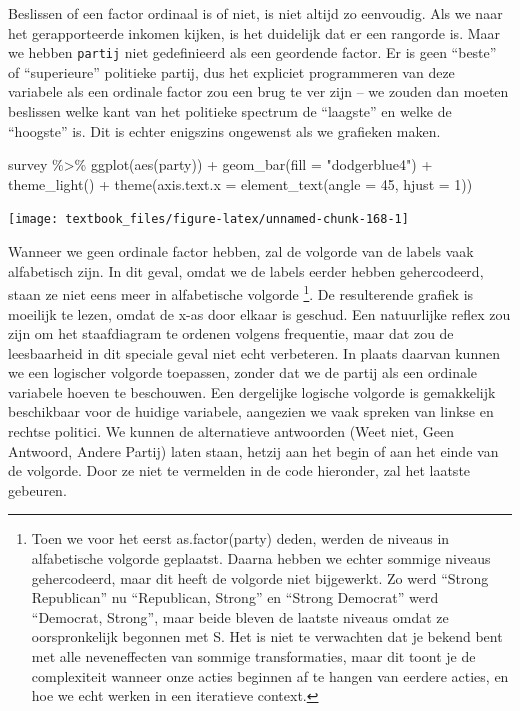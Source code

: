 \documentclass[]{tufte-book}
\newenvironment{Shaded}{}{}
\newcommand{\AttributeTok}[1]{\textcolor[rgb]{0.49,0.56,0.16}{#1}}
\newcommand{\DecValTok}[1]{\textcolor[rgb]{0.25,0.63,0.44}{#1}}
\newcommand{\FunctionTok}[1]{\textcolor[rgb]{0.02,0.16,0.49}{#1}}
\newcommand{\NormalTok}[1]{#1}
\newcommand{\SpecialCharTok}[1]{\textcolor[rgb]{0.25,0.44,0.63}{#1}}
\newcommand{\StringTok}[1]{\textcolor[rgb]{0.25,0.44,0.63}{#1}}
\begin{document}
Beslissen of een factor ordinaal is of niet, is niet altijd zo eenvoudig. Als we naar het gerapporteerde inkomen kijken, is het duidelijk dat er een rangorde is. Maar we hebben \texttt{partij} niet gedefinieerd als een geordende factor. Er is geen ``beste'' of ``superieure'' politieke partij, dus het expliciet programmeren van deze variabele als een ordinale factor zou een brug te ver zijn -- we zouden dan moeten beslissen welke kant van het politieke spectrum de ``laagste'' en welke de ``hoogste'' is. Dit is echter enigszins ongewenst als we grafieken maken.

\begin{Shaded}
\begin{Highlighting}[]
\NormalTok{survey }\SpecialCharTok{\%\textgreater{}\%}
  \FunctionTok{ggplot}\NormalTok{(}\FunctionTok{aes}\NormalTok{(party)) }\SpecialCharTok{+}
  \FunctionTok{geom\_bar}\NormalTok{(}\AttributeTok{fill =} \StringTok{"dodgerblue4"}\NormalTok{) }\SpecialCharTok{+}
  \FunctionTok{theme\_light}\NormalTok{() }\SpecialCharTok{+}
  \FunctionTok{theme}\NormalTok{(}\AttributeTok{axis.text.x =} \FunctionTok{element\_text}\NormalTok{(}\AttributeTok{angle =} \DecValTok{45}\NormalTok{, }\AttributeTok{hjust =} \DecValTok{1}\NormalTok{))}
\end{Highlighting}
\end{Shaded}

\texttt{[image: textbook\_files/figure-latex/unnamed-chunk-168-1]}

Wanneer we geen ordinale factor hebben, zal de volgorde van de labels vaak alfabetisch zijn. In dit geval, omdat we de labels eerder hebben gehercodeerd, staan ze niet eens meer in alfabetische volgorde \footnote{Toen we voor het eerst as.factor(party) deden, werden de niveaus in alfabetische volgorde geplaatst. Daarna hebben we echter sommige niveaus gehercodeerd, maar dit heeft de volgorde niet bijgewerkt. Zo werd ``Strong Republican'' nu ``Republican, Strong'' en ``Strong Democrat'' werd ``Democrat, Strong'', maar beide bleven de laatste niveaus omdat ze oorspronkelijk begonnen met S. Het is niet te verwachten dat je bekend bent met alle neveneffecten van sommige transformaties, maar dit toont je de complexiteit wanneer onze acties beginnen af te hangen van eerdere acties, en hoe we echt werken in een iteratieve context.}. De resulterende grafiek is moeilijk te lezen, omdat de x-as door elkaar is geschud. Een natuurlijke reflex zou zijn om het staafdiagram te ordenen volgens frequentie, maar dat zou de leesbaarheid in dit speciale geval niet echt verbeteren. In plaats daarvan kunnen we een logischer volgorde toepassen, zonder dat we de partij als een ordinale variabele hoeven te beschouwen. Een dergelijke logische volgorde is gemakkelijk beschikbaar voor de huidige variabele, aangezien we vaak spreken van linkse en rechtse politici. We kunnen de alternatieve antwoorden (Weet niet, Geen Antwoord, Andere Partij) laten staan, hetzij aan het begin of aan het einde van de volgorde. Door ze niet te vermelden in de code hieronder, zal het laatste gebeuren.
\end{document}
